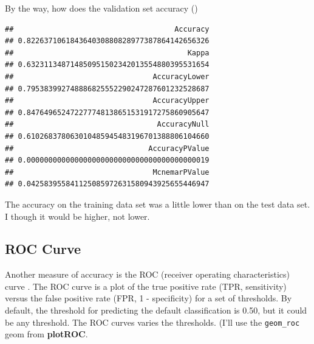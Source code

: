 \documentclass[
]{book}
\newenvironment{Shaded}{\begin{snugshade}}{\end{snugshade}}
\newcommand{\DataTypeTok}[1]{\textcolor[rgb]{0.13,0.29,0.53}{#1}}
\newcommand{\KeywordTok}[1]{\textcolor[rgb]{0.13,0.29,0.53}{\textbf{#1}}}
\newcommand{\NormalTok}[1]{#1}
\newcommand{\OperatorTok}[1]{\textcolor[rgb]{0.81,0.36,0.00}{\textbf{#1}}}
\newcommand{\StringTok}[1]{\textcolor[rgb]{0.31,0.60,0.02}{#1}}
\begin{document}
By the way, how does the validation set accuracy ()

\begin{Shaded}
\end{Shaded}

\begin{verbatim}
##                                     Accuracy 
## 0.822637106184364030880828977387864142656326 
##                                        Kappa 
## 0.632311348714850951502342013554880395531654 
##                                AccuracyLower 
## 0.795383992748886825552290247287601232528687 
##                                AccuracyUpper 
## 0.847649652472277748138651531917275860905647 
##                                 AccuracyNull 
## 0.610268378063010485945483196701388806104660 
##                               AccuracyPValue 
## 0.000000000000000000000000000000000000000019 
##                                McnemarPValue 
## 0.042583955841125085972631580943925655446947
\end{verbatim}

The accuracy on the training data set was a little lower than on the test data set. I though it would be higher, not lower.

\hypertarget{roc-curve}{%
\subsection{ROC Curve}\label{roc-curve}}

Another measure of accuracy is the ROC (receiver operating characteristics) curve \citep{Fawcett2005}. The ROC curve is a plot of the true positive rate (TPR, sensitivity) versus the false positive rate (FPR, 1 - specificity) for a set of thresholds. By default, the threshold for predicting the default classification is 0.50, but it could be any threshold. The ROC curves varies the thresholds. (I'll use the \texttt{geom\_roc} geom from \textbf{plotROC}.
\end{document}
